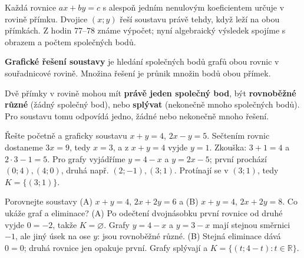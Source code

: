 \documentclass[11pt,a4paper]{article}
\begin{document}
Každá rovnice $ax+by=c$ s alespoň jedním nenulovým koeficientem určuje v rovině přímku. Dvojice $(x;y)$ řeší soustavu právě tehdy, když leží na obou přímkách. Z hodin 77–78 známe výpočet; nyní algebraický výsledek spojíme s obrazem a počtem společných bodů.
\begin{definiceBox}
\textbf{Grafické řešení soustavy} je hledání společných bodů grafů obou rovnic v souřadnicové rovině. Množina řešení je průnik množin bodů obou přímek.
\end{definiceBox}
\begin{definiceBox}
Dvě přímky v rovině mohou mít \textbf{právě jeden společný bod}, být \textbf{rovnoběžné různé} (žádný společný bod), nebo \textbf{splývat} (nekonečně mnoho společných bodů). Pro soustavu tomu odpovídá jedno, žádné nebo nekonečně mnoho řešení.
\end{definiceBox}
\begin{prikladReseniBox}
Řešte početně a graficky soustavu $x+y=4$, $2x-y=5$.
\tcblower
Sečtením rovnic dostaneme $3x=9$, tedy $x=3$, a z $x+y=4$ vyjde $y=1$. Zkouška: $3+1=4$ a $2\cdot3-1=5$. Pro grafy vyjádříme $y=4-x$ a $y=2x-5$; první prochází $(0;4),(4;0)$, druhá např. $(2;-1),(3;1)$. Protínají se v $(3;1)$, tedy $K=\{(3;1)\}$.
\end{prikladReseniBox}
\begin{center}
\end{center}
\begin{prikladReseniBox}
Porovnejte soustavy (A) $x+y=4$, $2x+2y=6$ a (B) $x+y=4$, $2x+2y=8$. Co ukáže graf a eliminace?
\tcblower
(A) Po odečtení dvojnásobku první rovnice od druhé vyjde $0=-2$, takže $K=\varnothing$. Grafy $y=4-x$ a $y=3-x$ mají stejnou směrnici $-1$, ale jiný úsek na ose $y$: jsou rovnoběžné různé. (B) Stejná eliminace dává $0=0$; druhá rovnice jen opakuje první. Grafy splývají a $K=\{(t;4-t):t\in\mathbb R\}$.
\end{prikladReseniBox}
\end{document}

